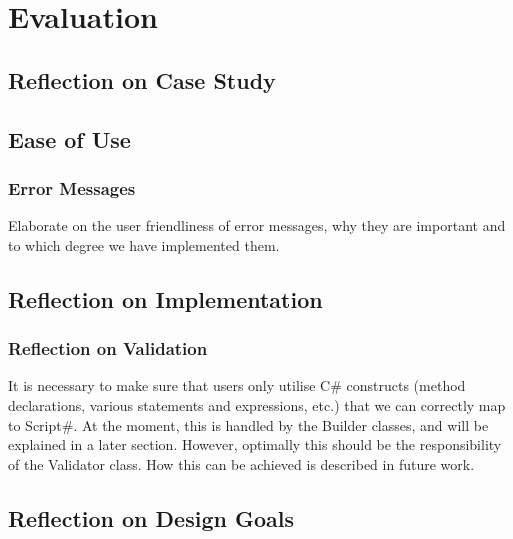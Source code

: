 \chapter{Evaluation}

\section{Reflection on Case Study} %
\label{sec:reflection_on_case_study}


\section{Ease of Use} %
\label{sec:ease_of_use}

	\subsection{Error Messages} %
	\label{sub:error_messages}
		Elaborate on the user friendliness of error messages, why they are important
		and to which degree we have implemented them.	


\section{Reflection on Implementation} %
\label{sec:reflection_on_implementation}
\subsection{Reflection on Validation} %
\label{sub:reflection_on_validation}
It is necessary to make sure that users only utilise C\# constructs (method declarations, various statements and expressions, etc.) that we can correctly map to Script\#. At the moment, this is handled by the Builder classes, and will be explained in a later section. However, optimally this should be the responsibility of the Validator class. How this can be achieved is described in future work.

\section{Reflection on Design Goals} %
\label{sec:reflection_on_design_goals}

